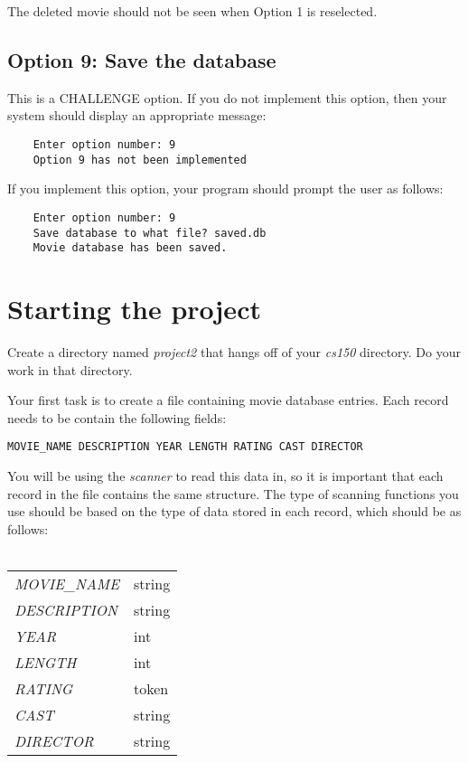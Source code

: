 \documentclass{article}
\begin{document}
The deleted movie should not be seen when Option 1 is reselected.

\subsection*{Option 9: Save the database}

This is a CHALLENGE option. If you do not implement this option, then
your system should display an appropriate message:

\begin{verbatim}
    Enter option number: 9
    Option 9 has not been implemented
\end{verbatim}

If you implement this option, your program should
prompt the user as follows:

\begin{verbatim}
    Enter option number: 9
    Save database to what file? saved.db
    Movie database has been saved.
\end{verbatim}

\section*{Starting the project}

Create a directory named {\it project2} that hangs off of your 
{\it cs150} directory. Do your work in that directory.

Your first task is to create a file containing movie database entries.
Each record needs to be contain the following fields:

\begin{verbatim}
MOVIE_NAME DESCRIPTION YEAR LENGTH RATING CAST DIRECTOR
\end{verbatim}

You will be using the {\it scanner} to read this data in, so it is important that
each record in the file contains the same structure.  The type
of scanning functions you use should be based on the type of data stored in each record,
which should be as follows:\\\\
\begin{tabular}[h]{ll}
{\it MOVIE\_NAME} & string\\
{\it DESCRIPTION} & string\\
{\it YEAR} & int\\
{\it LENGTH} & int\\
{\it RATING} & token\\
{\it CAST} & string\\
{\it DIRECTOR} & string\\
\end{tabular}
\end{document}

